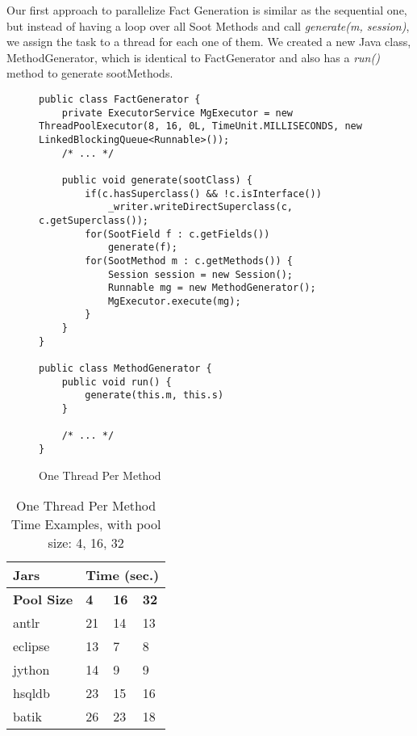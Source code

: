 \documentclass{dithesis}
\begin{document}
        Our first approach to parallelize Fact Generation is similar as the sequential one, but instead of having a loop over all Soot Methods and call \textit{generate(m, session)}, we assign the task to a thread for each one of them. We created a new Java class, MethodGenerator, which is identical to FactGenerator and also has a \textit{run()} method to generate sootMethods. 
        \begin{figure}[H]
\begin{lstlisting}
public class FactGenerator {
    private ExecutorService MgExecutor = new ThreadPoolExecutor(8, 16, 0L, TimeUnit.MILLISECONDS, new LinkedBlockingQueue<Runnable>());
    /* ... */

    public void generate(sootClass) {
        if(c.hasSuperclass() && !c.isInterface())
            _writer.writeDirectSuperclass(c, c.getSuperclass());
        for(SootField f : c.getFields())
            generate(f);
        for(SootMethod m : c.getMethods()) {
            Session session = new Session();
            Runnable mg = new MethodGenerator();
            MgExecutor.execute(mg);
        }
    }
}

public class MethodGenerator {
    public void run() {
        generate(this.m, this.s)
    }

    /* ... */
}
\end{lstlisting}
        \caption{One Thread Per Method}
        \end{figure}

		\begin{table}[H]
			\centering
\begin{tabular}{@{}l|lll@{}}
\toprule
\textbf{Jars}    	& \multicolumn{3}{l}{\textbf{Time (sec.)}}  \\ \midrule
\textbf{Pool Size} 	& \textbf{4}  & \textbf{16}  & \textbf{32}  \\ \midrule
antlr            	& 21          & 14           & 13           \\
eclipse          	& 13          & 7            & 8            \\
jython           	& 14          & 9            & 9            \\
hsqldb           	& 23          & 15           & 16           \\
batik            	& 26          & 23           & 18           \\ \bottomrule
\end{tabular}
			\caption{One Thread Per Method Time Examples, with pool size: 4, 16, 32}
		\end{table}
\end{document}
